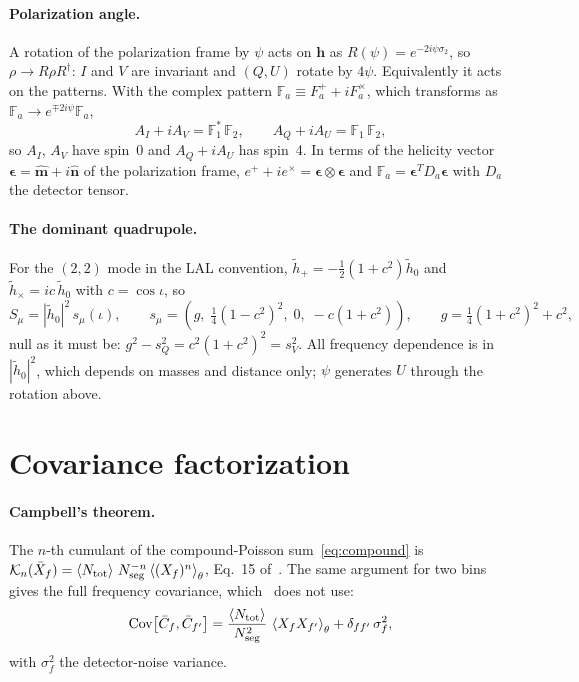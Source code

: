 \documentclass[11pt]{article}
\newcommand{\avg}[1]{\left\langle #1 \right\rangle}
\newcommand{\bh}{\bm{h}}
\newcommand{\ft}[1]{\tilde{#1}}
\theoremstyle{remark}
\begin{document}
\paragraph{Polarization angle.}
A rotation of the polarization frame by $\psi$ acts on $\bh$ as
$R(\psi) = e^{-2i\psi\sigma_2}$, so $\rho \to R\rho R^\dagger$: $I$ and $V$ are
invariant and $(Q,U)$ rotate by $4\psi$. Equivalently it acts on the patterns.
With the complex pattern $\mathbb F_a \equiv F_a^+ + iF_a^\times$, which
transforms as $\mathbb F_a \to e^{\mp 2i\psi}\mathbb F_a$,
\begin{equation}
  A_I + i A_V = \mathbb F_1^*\, \mathbb F_2, \qquad
  A_Q + i A_U = \mathbb F_1\, \mathbb F_2 ,
  \label{eq:complex-patterns}
\end{equation}
so $A_I$, $A_V$ have spin~0 and $A_Q + iA_U$ has spin~4. In terms of the
helicity vector $\bm\epsilon = \hat{\bm m} + i\hat{\bm n}$ of the polarization
frame, $e^+ + ie^\times = \bm\epsilon\otimes\bm\epsilon$ and
$\mathbb F_a = \bm\epsilon^T D_a \bm\epsilon$ with $D_a$ the detector tensor.

\paragraph{The dominant quadrupole.}
For the $(2,2)$ mode in the LAL convention, $\ft h_+ = -\tfrac12(1+c^2)\ft h_0$
and $\ft h_\times = i c\, \ft h_0$ with $c = \cos\iota$, so
\begin{equation}
  S_\mu = |\ft h_0|^2\, s_\mu(\iota), \qquad
  s_\mu = \left( g,\; \tfrac14(1-c^2)^2,\; 0,\; -c(1+c^2) \right), \qquad
  g = \tfrac14(1+c^2)^2 + c^2 ,
  \label{eq:quadrupole}
\end{equation}
null as it must be: $g^2 - s_Q^2 = c^2(1+c^2)^2 = s_V^2$. All frequency
dependence is in $|\ft h_0|^2$, which depends on masses and distance only;
$\psi$ generates $U$ through the rotation above.

\section{Covariance factorization}

\paragraph{Campbell's theorem.}
The $n$-th cumulant of the compound-Poisson sum~\eqref{eq:compound} is
$\mathcal K_n(\bar X_f) = \avg{N_{\rm tot}}\, N_{\rm seg}^{-n}
\avg{(X_f)^n}_\theta$, Eq.~15 of~\cite{Zhong2026}. The same argument for two bins gives the full
frequency covariance, which~\cite{Zhong2026} does not use:
\begin{equation}
  \mathrm{Cov}\!\left[\bar C_f, \bar C_{f'}\right]
  = \frac{\avg{N_{\rm tot}}}{N_{\rm seg}^2}\, \avg{X_f X_{f'}}_\theta
  + \delta_{ff'}\,\sigma_f^2 ,
  \label{eq:campbell}
\end{equation}
with $\sigma_f^2$ the detector-noise variance.
\end{document}
